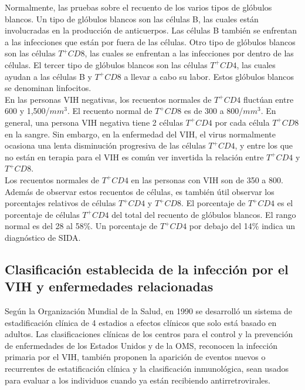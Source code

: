 	Normalmente, las pruebas sobre el recuento de los varios tipos de gl\'obulos blancos. Un tipo de gl\'obulos blancos son las c\'elulas B, las cuales est\'an involucradas en la producci\'on de anticuerpos. Las c\'elulas B tambi\'en se enfrentan a las infecciones que est\'an por fuera de las c\'elulas. Otro tipo de gl\'obulos blancos son las c\'elulas $T^{+}CD8$, las cuales se enfrentan a las infecciones por dentro de las c\'elulas. El tercer tipo de gl\'obulos blancos son las c\'elulas $T^{+}CD4$, las cuales ayudan a las c\'elulas B y $T^{+}CD8$ a llevar a cabo su labor. Estos gl\'obulos blancos se denominan linfocitos. \\ 

	En las personas VIH negativas, los recuentos normales de $T^{+}CD4$ fluct\'uan entre 600 y 1,500/$mm^{3}$. El recuento normal de $T^{+}CD8$ es de 300 a 800/$mm^{3}$. En general, una persona VIH negativa tiene 2 c\'elulas $T^{+}CD4$ por cada c\'elula $T^{+}CD8$ en la sangre. Sin embargo, en la enfermedad del VIH, el virus normalmente ocasiona una lenta disminuci\'on progresiva de las c\'elulas $T^{+}CD4$, y entre los que no est\'an en terapia para el VIH es com\'un ver invertida la relaci\'on entre $T^{+}CD4$ y $T^{+}CD8$. \\

	Los recuentos normales de $T^{+}CD4$ en las personas con VIH son de 350 a 800. Adem\'as de observar estos recuentos de c\'elulas, es tambi\'en \'util observar los porcentajes relativos de c\'elulas $T^{+}CD4$ y $T^{+}CD8$. El porcentaje de $T^{+}CD4$ es el porcentaje de c\'elulas $T^{+}CD4$ del total del recuento de gl\'obulos blancos. El rango normal es del 28 al 58\%. Un porcentaje de $T^{+}CD4$ por debajo del 14\% indica un diagn\'ostico de SIDA. \citet{ramduth} 
	
\subsection{Clasificaci\'on establecida de la infecci\'on por el VIH y enfermedades relacionadas}

	Seg\'un la Organizaci\'on Mundial de la Salud, en 1990 se desarroll\'o un sistema de estadificaci\'on cl\'inica de 4 estadios a efectos cl\'inicos que solo est\'a basado en adultos. Las clasificaciones cl\'inicas de los centros para el control y la prevenci\'on de enfermedades de los Estados Unidos y de la OMS, reconocen la infecci\'on primaria por el VIH, tambi\'en proponen la aparici\'on de eventos nuevos o recurrentes de estatificaci\'on cl\'inica y la clasificaci\'on inmunol\'ogica, sean usados para evaluar a los individuos cuando ya est\'an recibiendo antirretrovirales. \citet{oms} 

